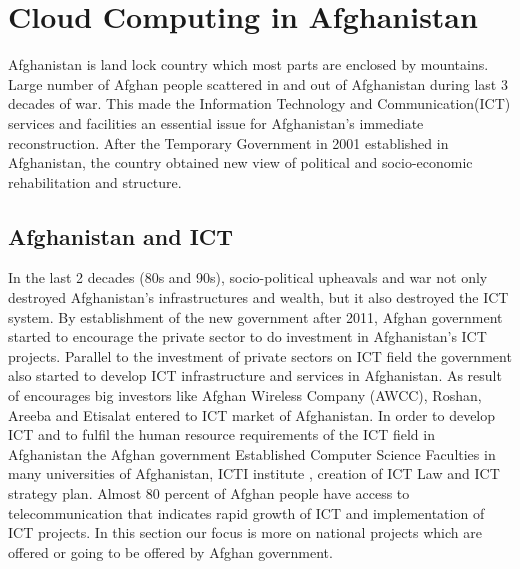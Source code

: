
\chapter{Cloud Computing in Afghanistan} %

\label{Chapter 6} %


Afghanistan is land lock country which most parts are enclosed by mountains.  Large  number of Afghan people scattered in and out of Afghanistan during last 3 decades of war.  This made the Information Technology and Communication(ICT) services and facilities an essential issue for Afghanistan’s immediate reconstruction. After the Temporary Government in 2001 established in Afghanistan, the country obtained new view of political and socio-economic rehabilitation and structure. 

\section{Afghanistan and ICT}
In the last 2 decades (80s and 90s), socio-political upheavals and war not only destroyed Afghanistan’s infrastructures and wealth, but it also destroyed the ICT  system. By establishment of the new government after 2011, Afghan government started to encourage the private sector to do investment in Afghanistan's ICT projects. Parallel to the investment of private sectors on ICT field  the government also started to develop ICT infrastructure and services in Afghanistan. As result of encourages big investors like Afghan Wireless Company (AWCC), Roshan, Areeba and Etisalat entered to ICT market of Afghanistan. In order to develop ICT and to fulfil the human resource requirements of the ICT field in Afghanistan the Afghan government Established Computer Science Faculties in many universities of Afghanistan, ICTI institute , creation of ICT Law and ICT strategy plan. Almost 80 percent of Afghan people have access to telecommunication that indicates rapid growth of ICT and implementation of ICT projects. In this section our focus is more on national projects which are offered or going to be offered by Afghan government.\cite{afg1}\\

